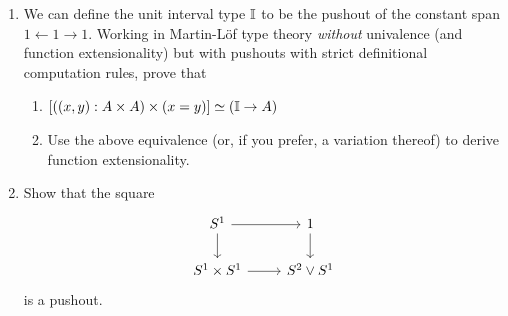 \documentclass[10pt,oneside,leqno,openright]{memoir}
\begin{document}
\begin{enumerate}

\item We can define the unit interval type $\mathbb{I}$ to be the pushout of the constant span $1 \leftarrow 1 \rightarrow 1$. Working in Martin-Löf type theory \emph{without} univalence (and function extensionality) but with pushouts with strict definitional computation rules, prove that
  \begin{enumerate}[label=(\roman*)]
  \item $ [((x, y) : A \times A) \times (x = y)] \simeq (\mathbb{I} \to A)$
  \item Use the above equivalence (or, if you prefer, a variation thereof) to derive function extensionality.
  \end{enumerate}
  
  \item Show that the square
    \[
    \begin{tikzcd}
      S^1 \ar[d,""']\ar[r,""] & 1\ar[d,"{}"] \\
      S^1 \times S^1 \ar[r,"{}"'] & S^2 \lor S^1
    \end{tikzcd}
  \]
  is a pushout.
\end{enumerate}
\newpage
\end{document}
